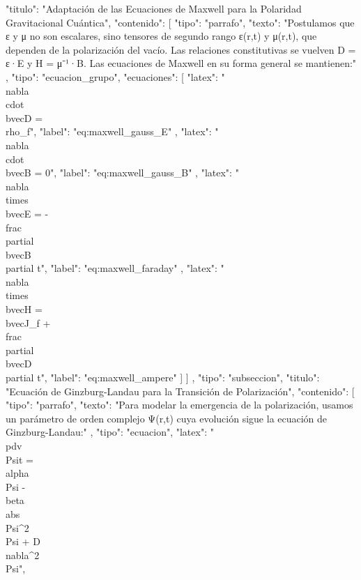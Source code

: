 \documentclass{article}
\begin{document}
{{{          "titulo": "Adaptación de las Ecuaciones de Maxwell para la Polaridad Gravitacional Cuántica",
          "contenido": [
            {
              "tipo": "parrafo",
              "texto": "Postulamos que ε y μ no son escalares, sino tensores de segundo rango ε(r,t) y μ(r,t), que dependen de la polarización del vacío. Las relaciones constitutivas se vuelven D = ε·E y H = μ⁻¹·B. Las ecuaciones de Maxwell en su forma general se mantienen:"
            },
            {
              "tipo": "ecuacion_grupo",
              "ecuaciones": [
                {
                  "latex": "\\nabla \\cdot \\bvec{D} = \\rho_f",
                  "label": "eq:maxwell_gauss_E"
                },
                {
                  "latex": "\\nabla \\cdot \\bvec{B} = 0",
                  "label": "eq:maxwell_gauss_B"
                },
                {
                  "latex": "\\nabla \\times \\bvec{E} = - \\frac{\\partial \\bvec{B}}{\\partial t}",
                  "label": "eq:maxwell_faraday"
                },
                {
                  "latex": "\\nabla \\times \\bvec{H} = \\bvec{J}_f + \\frac{\\partial \\bvec{D}}{\\partial t}",
                  "label": "eq:maxwell_ampere"
                }
              ]
            }
          ]
        },
        {
          "tipo": "subseccion",
          "titulo": "Ecuación de Ginzburg-Landau para la Transición de Polarización",
          "contenido": [
            {
              "tipo": "parrafo",
              "texto": "Para modelar la emergencia de la polarización, usamos un parámetro de orden complejo Ψ(r,t) cuya evolución sigue la ecuación de Ginzburg-Landau:"
            },
            {
              "tipo": "ecuacion",
              "latex": "\\pdv{\\Psi}{t} = \\alpha \\Psi - \\beta \\abs{\\Psi}^2 \\Psi + D \\nabla^2 \\Psi",
}}}}
\end{document}
